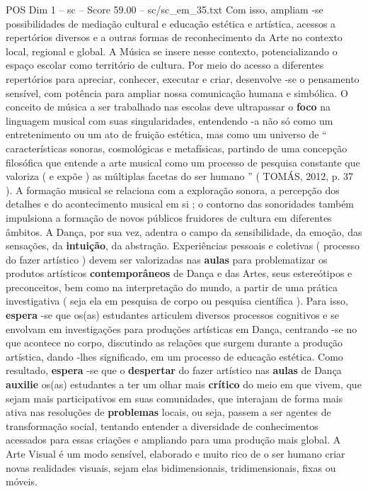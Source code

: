 \begin{textsample}{POS Dim 1 – sc – Score 59.00 – sc/sc\_em\_35.txt}
Com isso, ampliam -se possibilidades de mediação cultural e educação estética e artística, acessos a repertórios diversos e a outras formas de reconhecimento da Arte no contexto local, regional e global.
A Música se insere nesse contexto, potencializando o espaço escolar como território de cultura.
Por meio do acesso a diferentes repertórios para apreciar, conhecer, executar e criar, desenvolve -se o pensamento sensível, com potência para ampliar nossa comunicação humana e simbólica.
O conceito de música a ser trabalhado nas escolas deve ultrapassar o \textbf{foco} na linguagem musical com suas singularidades, entendendo -a não só como um entretenimento ou um ato de fruição estética, mas como um universo de “ características sonoras, cosmológicas e metafísicas, partindo de uma concepção filosófica que entende a arte musical como um processo de pesquisa constante que valoriza ( e expõe ) as múltiplas facetas do ser humano ” ( TOMÁS, 2012, p. 37 ).
A formação musical se relaciona com a exploração sonora, a percepção dos detalhes e do acontecimento musical em si ; o contorno das sonoridades também impulsiona a formação de novos públicos fruidores de cultura em diferentes âmbitos.
A Dança, por sua vez, adentra o campo da sensibilidade, da emoção, das sensações, da \textbf{intuição}, da abstração.
Experiências pessoais e coletivas ( processo do fazer artístico ) devem ser valorizadas nas \textbf{aulas} para problematizar os produtos artísticos \textbf{contemporâneos} de Dança e das Artes, seus estereótipos e preconceitos, bem como na interpretação do mundo, a partir de uma prática investigativa ( seja ela em pesquisa de corpo ou pesquisa científica ).
Para isso, \textbf{espera} -se que os(as) estudantes articulem diversos processos cognitivos e se envolvam em investigações para produções artísticas em Dança, centrando -se no que acontece no corpo, discutindo as relações que surgem durante a produção artística, dando -lhes significado, em um processo de educação estética.
Como resultado, \textbf{espera} -se que o \textbf{despertar} do fazer artístico nas \textbf{aulas} de Dança \textbf{auxilie} os(as) estudantes a ter um olhar mais \textbf{crítico} do meio em que vivem, que sejam mais participativos em suas comunidades, que interajam de forma mais ativa nas resoluções de \textbf{problemas} locais, ou seja, passem a ser agentes de transformação social, tentando entender a diversidade de conhecimentos acessados para essas criações e ampliando para uma produção mais global.
A Arte Visual é um modo sensível, elaborado e muito rico de o ser humano criar novas realidades visuais, sejam elas bidimensionais, tridimensionais, fixas ou móveis.

\end{textsample}
